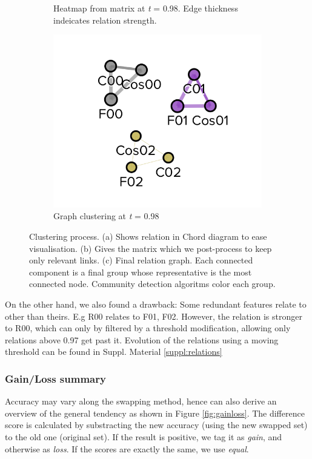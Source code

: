 \begin{figure}[!h]
\begin{subfigure}[b]{0.3\linewidth}
		\caption{Heatmap from matrix at \emph{t} = 0.98. Edge thickness indeicates relation strength.}
	\end{subfigure}
	\hfill
	\begin{subfigure}[b]{0.3\linewidth}
		\includegraphics[width=\linewidth]{Major Thesis/figures/graphs/graph-toy.png}
		\caption{Graph clustering at \emph{t} = 0.98}
	\end{subfigure}
	\label{fig:triade}
	\caption{Clustering process. (a) Shows relation in Chord diagram to ease visualisation. (b) Gives the matrix which we post-process to keep only relevant links. (c) Final relation graph. Each connected component is a final group whose representative is the most connected node. Community detection algoritms color each group.}
\end{figure}

On the other hand, we also found a drawback: Some redundant features relate to other than theirs. E.g R00 relates to F01, F02. However, the relation is stronger to R00, which can only by filtered by a threshold modification, allowing only relations above 0.97 get past it. Evolution of the relations using a moving threshold can be found in Suppl. Material \ref{suppl:relations}

\subsubsection{Gain/Loss summary}
Accuracy may vary along the swapping method, hence can also derive an overview of the general tendency as shown in Figure \ref{fig:gainloss}. The difference score is calculated by substracting the new accuracy (using the new swapped set) to the old one (original set). If the result is positive, we tag it as \emph{gain}, and otherwise as \emph{loss}. If the scores are exactly the same, we use \emph{equal}.

